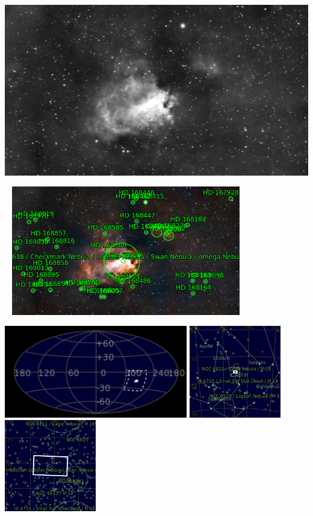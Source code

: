 {\footnotesize\color{white}


}\ \\
\includegraphics[width=\textwidth]{../Imaging//Grayscale/Swann_Nebula.jpg}
\begin{center}
 \ \newpage
\includegraphics[width=0.75\textwidth]{../Imaging//Annotated/Swann_Nebula_Annotated.jpg}

\includegraphics[height=4cm]{../Imaging//Annotated/Swann_Nebula_Globe.jpg}
\includegraphics[height=4cm]{../Imaging//Annotated/Swann_Nebula_Close.jpg}
\includegraphics[height=4cm]{../Imaging//Annotated/Swann_Nebula_Closer.jpg}
\end{center}
